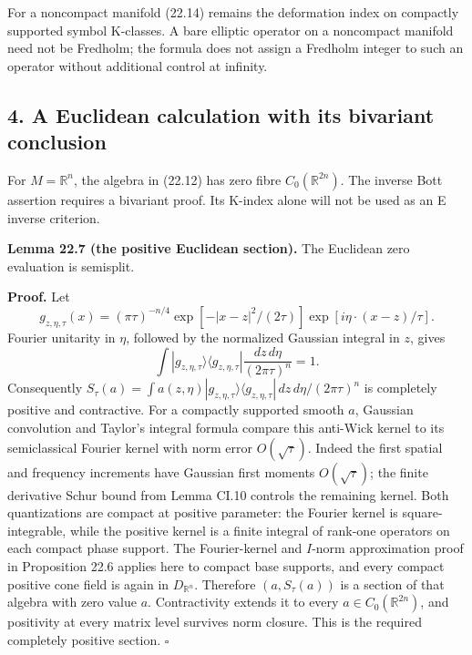 \documentclass[
  11pt,
]{article}
\begin{document}
For a noncompact manifold (22.14) remains the deformation index on
compactly supported symbol K-classes. A bare elliptic operator on a
noncompact manifold need not be Fredholm; the formula does not assign a
Fredholm integer to such an operator without additional control at
infinity.

\subsection{4. A Euclidean calculation with its bivariant
conclusion}\label{a-euclidean-calculation-with-its-bivariant-conclusion}

For \(M=\mathbb R^n\), the algebra in (22.12) has zero fibre
\(C_0(\mathbb R^{2n})\). The inverse Bott assertion requires a bivariant
proof. Its K-index alone will not be used as an E inverse criterion.

\textbf{Lemma 22.7 (the positive Euclidean section).} The Euclidean zero
evaluation is semisplit.

\textbf{Proof.} Let \[
g_{z,\eta,\tau}(x)=(\pi\tau)^{-n/4}
\exp[-|x-z|^2/(2\tau)]\exp[i\eta\cdot(x-z)/\tau].
\tag{22.16}
\] Fourier unitarity in \(\eta\), followed by the normalized Gaussian
integral in \(z\), gives \[
\int |g_{z,\eta,\tau}\rangle\langle g_{z,\eta,\tau}|
\frac{dz\,d\eta}{(2\pi\tau)^n}=1.
\tag{22.17}
\] Consequently \(S_\tau(a)=\int a(z,\eta)|g_{z,\eta,\tau}\rangle
\langle g_{z,\eta,\tau}|\,dz\,d\eta/(2\pi\tau)^n\) is completely
positive and contractive. For a compactly supported smooth \(a\),
Gaussian convolution and Taylor's integral formula compare this
anti-Wick kernel to its semiclassical Fourier kernel with norm error
\(O(\sqrt{\tau})\). Indeed the first spatial and frequency increments
have Gaussian first moments \(O(\sqrt{\tau})\); the finite derivative
Schur bound from Lemma CI.10 controls the remaining kernel. Both
quantizations are compact at positive parameter: the Fourier kernel is
square-integrable, while the positive kernel is a finite integral of
rank-one operators on each compact phase support. The Fourier-kernel and
\(I\)-norm approximation proof in Proposition 22.6 applies here to
compact base supports, and every compact positive cone field is again in
\(D_{\mathbb R^n}\). Therefore \((a,S_\tau(a))\) is a section of that
algebra with zero value \(a\). Contractivity extends it to every
\(a\in C_0(\mathbb R^{2n})\), and positivity at every matrix level
survives norm closure. This is the required completely positive section.
\(\square\)
\end{document}
